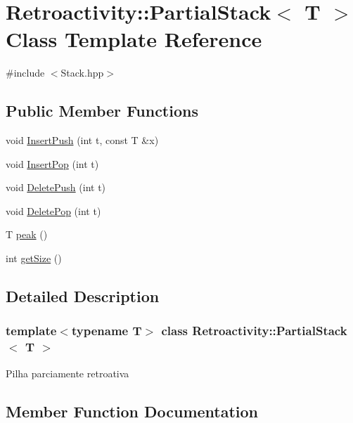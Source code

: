 \hypertarget{classRetroactivity_1_1PartialStack}{}\section{Retroactivity\+:\+:Partial\+Stack$<$ T $>$ Class Template Reference}
\label{classRetroactivity_1_1PartialStack}


{\ttfamily \#include $<$Stack.\+hpp$>$}

\subsection*{Public Member Functions}
\begin{DoxyCompactItemize}
\item 
void \hyperlink{classRetroactivity_1_1PartialStack_afe78dbdae52e05e0a006017528d74088}{Insert\+Push} (int t, const T \&x)
\item 
void \hyperlink{classRetroactivity_1_1PartialStack_a54fffb09c5aca4b6dba7c6fb62af1302}{Insert\+Pop} (int t)
\item 
void \hyperlink{classRetroactivity_1_1PartialStack_a91760ea459d619b817f5d819a8afac83}{Delete\+Push} (int t)
\item 
void \hyperlink{classRetroactivity_1_1PartialStack_a5b0b2282b35bc5d6da67b481cb6fa2cb}{Delete\+Pop} (int t)
\item 
T \hyperlink{classRetroactivity_1_1PartialStack_acae5efe5b39b6369f11bb574bc15d73e}{peak} ()
\item 
int \hyperlink{classRetroactivity_1_1PartialStack_a770d2d1ebb3e72296caeef6876f37a54}{get\+Size} ()
\end{DoxyCompactItemize}


\subsection{Detailed Description}
\subsubsection*{template$<$typename T$>$\newline
class Retroactivity\+::\+Partial\+Stack$<$ T $>$}

Pilha parciamente retroativa 

\subsection{Member Function Documentation}
\mbox{\label{classRetroactivity_1_1PartialStack_a5b0b2282b35bc5d6da67b481cb6fa2cb}} 
